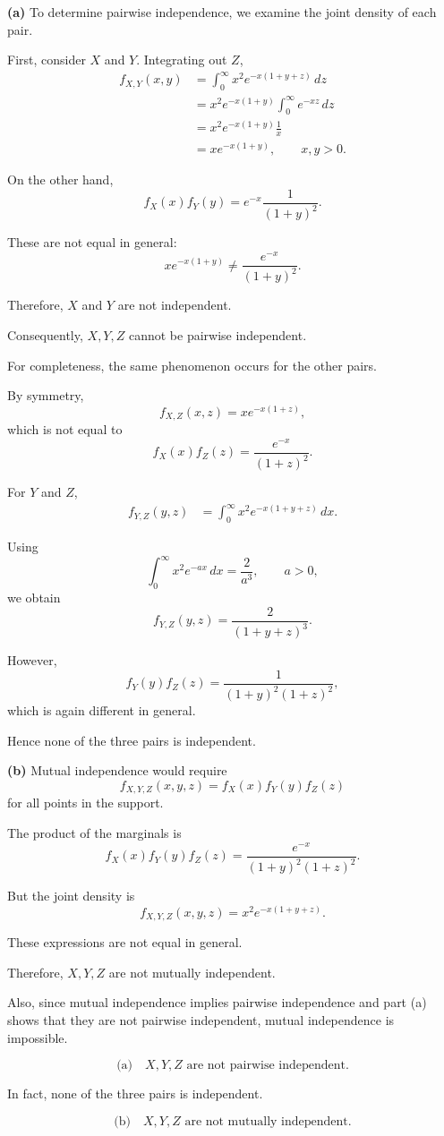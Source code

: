 \documentclass[11pt]{article}
\begin{document}
\begin{solutionbox}

\textbf{(a)} To determine pairwise independence, we examine the joint
density of each pair.

First, consider \(X\) and \(Y\). Integrating out \(Z\),
\begin{align*}
f_{X,Y}(x,y)
&=
\int_0^\infty
x^2e^{-x(1+y+z)}\,dz\\
&=
x^2e^{-x(1+y)}
\int_0^\infty e^{-xz}\,dz\\
&=
x^2e^{-x(1+y)}
\frac1x\\
&=
xe^{-x(1+y)},
\qquad x,y>0.
\end{align*}

On the other hand,
\[
f_X(x)f_Y(y)
=
e^{-x}\frac{1}{(1+y)^2}.
\]

These are not equal in general:
\[
xe^{-x(1+y)}
\neq
\frac{e^{-x}}{(1+y)^2}.
\]

Therefore, \(X\) and \(Y\) are not independent.

Consequently, \(X,Y,Z\) cannot be pairwise independent.

For completeness, the same phenomenon occurs for the other pairs.

By symmetry,
\[
f_{X,Z}(x,z)
=
xe^{-x(1+z)},
\]
which is not equal to
\[
f_X(x)f_Z(z)
=
\frac{e^{-x}}{(1+z)^2}.
\]

For \(Y\) and \(Z\),
\begin{align*}
f_{Y,Z}(y,z)
&=
\int_0^\infty
x^2e^{-x(1+y+z)}\,dx.
\end{align*}

Using
\[
\int_0^\infty x^2e^{-ax}\,dx
=
\frac{2}{a^3},
\qquad a>0,
\]
we obtain
\[
f_{Y,Z}(y,z)
=
\frac{2}{(1+y+z)^3}.
\]

However,
\[
f_Y(y)f_Z(z)
=
\frac{1}{(1+y)^2(1+z)^2},
\]
which is again different in general.

Hence none of the three pairs is independent.


\textbf{(b)} Mutual independence would require
\[
f_{X,Y,Z}(x,y,z)
=
f_X(x)f_Y(y)f_Z(z)
\]
for all points in the support.

The product of the marginals is
\[
f_X(x)f_Y(y)f_Z(z)
=
\frac{e^{-x}}
{(1+y)^2(1+z)^2}.
\]

But the joint density is
\[
f_{X,Y,Z}(x,y,z)
=
x^2e^{-x(1+y+z)}.
\]

These expressions are not equal in general.

Therefore, \(X,Y,Z\) are not mutually independent.

Also, since mutual independence implies pairwise independence and part (a)
shows that they are not pairwise independent, mutual independence is
impossible.

\begin{finalanswerbox}

\[
\text{(a)}\quad
X,Y,Z\text{ are not pairwise independent.}
\]

In fact, none of the three pairs is independent.

\[
\text{(b)}\quad
X,Y,Z\text{ are not mutually independent.}
\]

\end{finalanswerbox}

\end{solutionbox}
\end{document}
